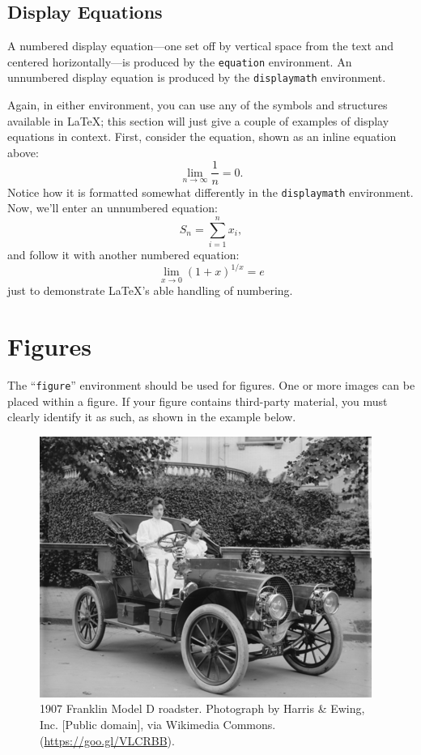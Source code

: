 \documentclass[
twocolumn,
]{ceurart}
\begin{document}
\subsection{Display Equations}

A numbered display equation---one set off by vertical space from the
text and centered horizontally---is produced by the \verb|equation|
environment. An unnumbered display equation is produced by the
\verb|displaymath| environment.

Again, in either environment, you can use any of the symbols and
structures available in \LaTeX{}; this section will just give a couple
of examples of display equations in context.  First, consider the
equation, shown as an inline equation above:
\begin{equation}
  \lim_{n\rightarrow \infty} \frac{1}{n} = 0.
\end{equation}
Notice how it is formatted somewhat differently in
the \verb|displaymath|
environment.  Now, we'll enter an unnumbered equation:
\begin{displaymath}
  S_{n} = \sum_{i=1}^{n} x_{i} ,
\end{displaymath}
and follow it with another numbered equation:
\begin{equation}
  \lim_{x \to 0} (1 + x)^{1/x} = e
\end{equation}
just to demonstrate \LaTeX's able handling of numbering.

\section{Figures}

The ``\verb|figure|'' environment should be used for figures. One or
more images can be placed within a figure. If your figure contains
third-party material, you must clearly identify it as such, as shown
in the example below.
\begin{figure}
  \centering
  \includegraphics[width=\linewidth]{sample-franklin}
  \caption{1907 Franklin Model D roadster. Photograph by Harris \&
    Ewing, Inc. [Public domain], via Wikimedia
    Commons. (\url{https://goo.gl/VLCRBB}).}
\end{figure}
\end{document}
